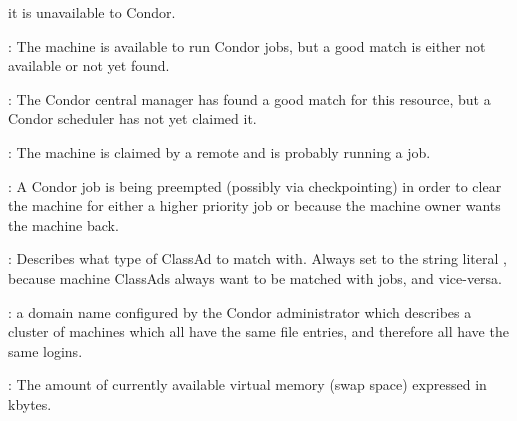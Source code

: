 \begin{description}
\begin{description}
it is unavailable to Condor.
	\item[\AdStr{Unclaimed}] : The machine is available to run Condor jobs,
but a good match is either not available or not 
yet found.
	\item[\AdStr{Matched}] : The Condor central manager has found a good
match for this resource, but a Condor scheduler has not yet claimed it.
	\item[\AdStr{Claimed}] : The machine is claimed by a remote
 and is probably running a job.
	\item[\AdStr{Preempting}] : A Condor job is being preempted (possibly
via checkpointing) in order to clear the machine for either a higher
priority job or because the machine owner wants the machine back.
	\end{description}   %
%
\item[\AdAttr{TargetType}] : Describes what type of ClassAd to match with.
Always set to the string literal , because machine ClassAds
always want to be matched with jobs, and vice-versa.
%
\item[\AdAttr{UidDomain}] : a domain name configured by the Condor 
administrator which describes a cluster of machines which all have 
the same  file entries, and therefore all have the same logins.
%
\item[\AdAttr{VirtualMemory}] : The amount of currently available virtual memory 
(swap space) expressed in kbytes.

\end{description}
